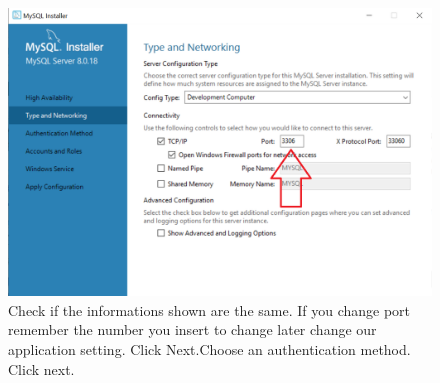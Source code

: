 \begin{figure}[h]
\centering
\includegraphics[width=\textwidth]{Images/second-mysql.png}
\caption{\label{fig:fmy} Check if the informations shown are the same. If you change port remember the number you insert to change later change our application setting. Click Next.Choose an authentication method. Click next.}
\end{figure} 

